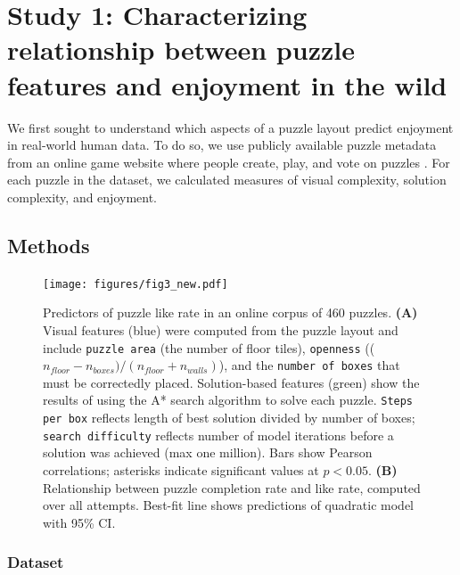 \documentclass[10pt,letterpaper]{article}
\begin{document}
\section{Study 1: Characterizing relationship between puzzle features and enjoyment in the wild}
We first sought to understand which aspects of a puzzle layout predict enjoyment in real-world human data. To do so, we use publicly available puzzle metadata from an online game website where people create, play, and vote on puzzles \cite{sokobanonline}. For each puzzle in the dataset, we calculated measures of visual complexity, solution complexity, and enjoyment. 

\subsection{Methods}

\begin{figure}[ht]
    \centering
    \texttt{[image: figures/fig3\_new.pdf]}
    \caption{Predictors of puzzle like rate in an online corpus of 460 puzzles. \textbf{(A)} Visual features (blue) were computed from the puzzle layout and include \texttt{puzzle area} (the number of floor tiles), \texttt{openness} (($n_{floor} - n_{boxes}) / (n_{floor} + n_{walls})$), and the \texttt{number of boxes} that must be correctedly placed. 
    Solution-based features (green) show the results of using the A* search algorithm to solve each puzzle. \texttt{Steps per box} reflects length of best solution divided by number of boxes; \texttt{search difficulty} reflects number of model iterations before a solution was achieved (max one million). Bars show Pearson correlations; asterisks indicate significant values at $p < 0.05$. \textbf{(B)} Relationship between puzzle completion rate and like rate, computed over all attempts. Best-fit line shows predictions of quadratic model with 95\% CI.}
    \label{fig:gleaning-figure}
\end{figure}



\subsubsection{Dataset}
\end{document}
